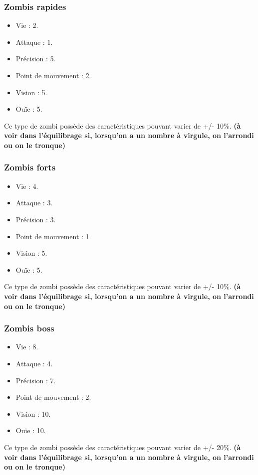 \subsubsection{Zombis rapides}
\begin{itemize}
  \item Vie : 2.
  \item Attaque : 1.
  \item Précision : 5.
  \item Point de mouvement : 2.
  \item Vision : 5.
  \item Ouïe : 5.
\end{itemize}
Ce type de zombi possède des caractéristiques pouvant varier de +/- 10\%. \textbf{(à voir dans l'équilibrage si, lorsqu'on a un nombre à virgule, on l'arrondi ou on le tronque)}
\subsubsection{Zombis forts}
\begin{itemize}
  \item Vie : 4.
  \item Attaque : 3.
  \item Précision : 3.
  \item Point de mouvement : 1.
  \item Vision : 5.
  \item Ouïe : 5.
\end{itemize}
Ce type de zombi possède des caractéristiques pouvant varier de +/- 10\%. \textbf{(à voir dans l'équilibrage si, lorsqu'on a un nombre à virgule, on l'arrondi ou on le tronque)}
\subsubsection{Zombis boss}
\begin{itemize}
  \item Vie : 8.
  \item Attaque : 4.
  \item Précision : 7.
  \item Point de mouvement : 2.
  \item Vision : 10.
  \item Ouïe : 10.
\end{itemize}
Ce type de zombi possède des caractéristiques pouvant varier de +/- 20\%. \textbf{(à voir dans l'équilibrage si, lorsqu'on a un nombre à virgule, on l'arrondi ou on le tronque)}
